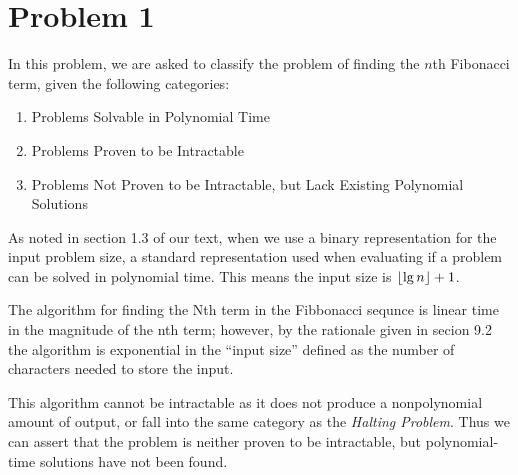 \section*{Problem 1}

In this problem, we are asked to classify the problem of finding the $n$th Fibonacci term, given the following categories:
\begin{enumerate}
    \item Problems Solvable in Polynomial Time
    \item Problems Proven to be Intractable
    \item Problems Not Proven to be Intractable, but Lack Existing Polynomial Solutions
\end{enumerate}

As noted in section 1.3 of our text, when we use a binary representation for the input problem size, a standard representation used when evaluating if a problem can be solved in polynomial time. This means the input size is $\lfloor\lg n\rfloor + 1$.

The algorithm for finding the Nth term in the Fibbonacci sequnce is linear time
in the magnitude of the nth term; however, by the rationale given in secion 9.2
the algorithm is exponential in the ``input size'' defined as the number of 
characters needed to store the input.

This algorithm cannot be intractable as it does not produce a nonpolynomial 
amount of output, or fall into the same category as the 
\textit{Halting Problem}. Thus we can assert that the problem is neither proven
to be intractable, but polynomial-time solutions have not been found.
